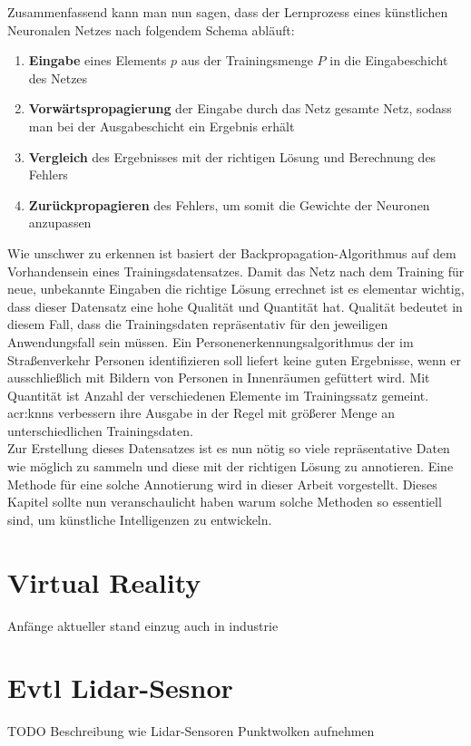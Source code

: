 Zusammenfassend kann man nun sagen, dass der Lernprozess eines künstlichen Neuronalen Netzes nach folgendem Schema abläuft:

\begin{enumerate}
\item \textbf{Eingabe} eines Elements \(p\) aus der Trainingsmenge \(P\) in die Eingabeschicht des Netzes
\item \textbf{Vorwärtspropagierung} der Eingabe durch das Netz gesamte Netz, sodass man bei der Ausgabeschicht ein Ergebnis erhält
\item \textbf{Vergleich} des Ergebnisses mit der richtigen Lösung und Berechnung des Fehlers
\item \textbf{Zurückpropagieren} des Fehlers, um somit die Gewichte der Neuronen anzupassen
\end{enumerate}

Wie unschwer zu erkennen ist basiert der Backpropagation-Algorithmus auf dem Vorhandensein eines Trainingsdatensatzes. Damit das Netz nach dem Training für neue, unbekannte Eingaben die richtige Lösung errechnet ist es elementar wichtig, dass dieser Datensatz eine hohe Qualität und Quantität hat. Qualität bedeutet in diesem Fall, dass die Trainingsdaten repräsentativ für den jeweiligen Anwendungsfall sein müssen. Ein Personenerkennungsalgorithmus der im Straßenverkehr Personen identifizieren soll liefert keine guten Ergebnisse, wenn er ausschließlich mit Bildern von Personen in Innenräumen gefüttert wird. Mit Quantität ist Anzahl der verschiedenen Elemente im Trainingssatz gemeint. \acrshort{acr:knn}s verbessern ihre Ausgabe in der Regel mit größerer Menge an unterschiedlichen Trainingsdaten.\\

Zur Erstellung dieses Datensatzes ist es nun nötig so viele repräsentative Daten wie möglich zu sammeln und diese mit der richtigen Lösung zu annotieren. Eine Methode für eine solche Annotierung wird in dieser Arbeit vorgestellt. Dieses Kapitel sollte nun veranschaulicht haben warum  solche Methoden so essentiell sind, um künstliche Intelligenzen zu entwickeln.


\section{Virtual Reality}


Anfänge 
aktueller stand
einzug auch in industrie 

\section{Evtl Lidar-Sesnor}
TODO
Beschreibung wie Lidar-Sensoren Punktwolken aufnehmen







